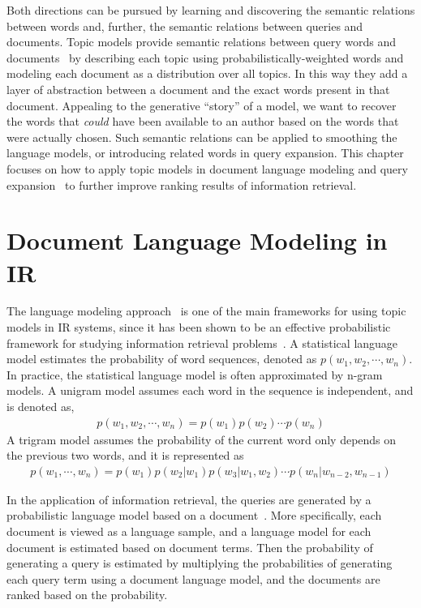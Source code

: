 Both directions can be pursued by learning and discovering the
semantic relations between words and, further, the semantic relations
between queries and documents. Topic models provide semantic relations between query words and
documents~\citep{deerwester-90,hofmann-99a} by describing each topic
using probabilistically-weighted words and modeling each document as a distribution over
all topics.
In this way they add a layer of abstraction between a document and the exact words present in that document.
Appealing to the generative ``story'' of a model, we want to recover the words that {\em could} have been available to an author based on the words that were actually chosen.
Such semantic relations
can be applied to smoothing the language models, or introducing
related words in query expansion. This chapter focuses on how to apply
topic models in document language modeling \citep{Lu-2011,wei-06} and
query expansion~\citep{Park-2009,Andrzejewski-2011} to further improve
 ranking results of information retrieval.

\section{Document Language Modeling in IR}
\label{sec:ir-lm}

The language modeling approach~\citep{croft-03,PonteCroft,song-99} is
one of the main frameworks for using topic models in IR systems, since
it has been shown to be an effective probabilistic framework for studying
information retrieval problems~\citep{PonteCroft,berger-99}.
A statistical language model estimates the probability of word
sequences, denoted as $p(w_1,w_2,\cdots,w_n)$. In practice, the
statistical language model is often approximated by n-gram models. A
unigram model assumes each word in the sequence is independent, and is
denoted as,
\begin{align}
p(w_1,w_2,\cdots,w_n) = p(w_1)p(w_2) \cdots p(w_n)
\end{align}
A trigram model assumes the probability of the current word only
depends on the previous two words, and it is represented as
\begin{align}
p(w_1,\cdots,w_n)=p(w_1)p(w_2|w_1)p(w_3|w_1,w_2)\cdots p(w_n|w_{n-2},w_{n-1})
\end{align}

In the application of information retrieval, the queries are generated
by a probabilistic language model based on a
document~\citep{zhai-01}. More specifically, each document is viewed
as a language sample, and a language model for each document is
estimated based on document terms. Then the
probability of generating a query is estimated by multiplying the probabilities of
generating each query term using a document language model,
and the documents are ranked based on the probability.

